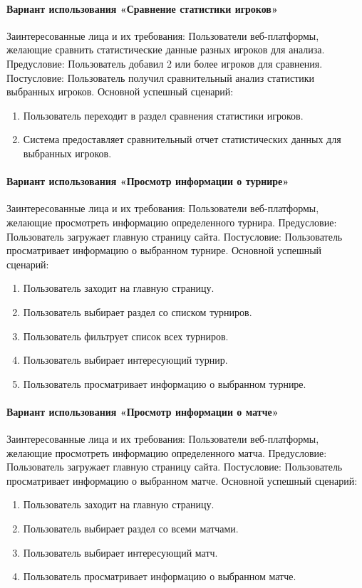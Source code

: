 \paragraph{Вариант использования «Сравнение статистики игроков»}
Заинтересованные лица и их требования: Пользователи веб-платформы, желающие сравнить статистические данные разных игроков для анализа.
Предусловие: Пользователь добавил 2 или более игроков для сравнения.
Постусловие: Пользователь получил сравнительный анализ статистики выбранных игроков.
Основной успешный сценарий:
\begin{enumerate}
	\item Пользователь переходит в раздел сравнения статистики игроков.
	\item Система предоставляет сравнительный отчет статистических данных для выбранных игроков.
\end{enumerate}

\paragraph{Вариант использования «Просмотр информации о турнире»}
Заинтересованные лица и их требования: Пользователи веб-платформы, желающие просмотреть информацию определенного турнира.
Предусловие: Пользователь загружает главную страницу сайта.
Постусловие: Пользователь просматривает информацию о выбранном турнире.
Основной успешный сценарий:
\begin{enumerate}
	\item Пользователь заходит на главную страницу.
	\item Пользователь выбирает раздел со списком турниров.
	\item Пользователь фильтрует список всех турниров.
	\item Пользователь выбирает интересующий турнир.
	\item Пользователь просматривает информацию о выбранном турнире.
\end{enumerate}

\paragraph{Вариант использования «Просмотр информации о матче»}
Заинтересованные лица и их требования: Пользователи веб-платформы, желающие просмотреть информацию определенного матча.
Предусловие: Пользователь загружает главную страницу сайта.
Постусловие: Пользователь просматривает информацию о выбранном матче.
Основной успешный сценарий:
\begin{enumerate}
	\item Пользователь заходит на главную страницу.
	\item Пользователь выбирает раздел со всеми матчами.
	\item Пользователь выбирает интересующий матч.
	\item Пользователь просматривает информацию о выбранном матче.
\end{enumerate}

